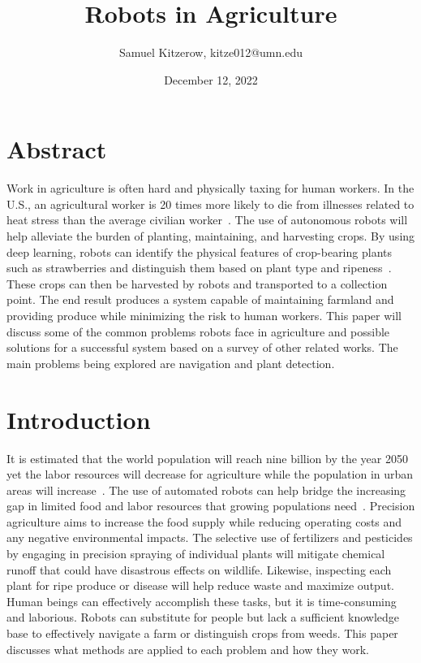 \documentclass[12pt]{article}
\title{Robots in Agriculture}
\author{Samuel Kitzerow, kitze012@umn.edu}
\date{December 12, 2022}
\begin{document}
\maketitle
\section*{Abstract}
Work in agriculture is often hard and physically taxing for human workers. In the U.S., an agricultural worker is 20 times more likely to die from illnesses related to heat stress than the average civilian worker~\cite{tigchelaar2020work}. The use of autonomous robots will help alleviate the burden of planting, maintaining, and harvesting crops. By using deep learning, robots can identify the physical features of crop-bearing plants such as strawberries and distinguish them based on plant type and ripeness~\cite{yu2019fruit}. These crops can then be harvested by robots and transported to a collection point. The end result produces a system capable of maintaining farmland and providing produce while minimizing the risk to human workers. This paper will discuss some of the common problems robots face in agriculture and possible solutions for a successful system based on a survey of other related works. The main problems being explored are navigation and plant detection.

\section{Introduction}
It is estimated that the world population will reach nine billion by the year 2050 yet the labor resources will decrease for agriculture while the population in urban areas will increase~\cite{9096177}. The use of automated robots can help bridge the increasing gap in limited food and labor resources that growing populations need~\cite{zhou2022intelligent}. Precision agriculture aims to increase the food supply while reducing operating costs and any negative environmental impacts. The selective use of fertilizers and pesticides by engaging in precision spraying of individual plants will mitigate chemical runoff that could have disastrous effects on wildlife. Likewise, inspecting each plant for ripe produce or disease will help reduce waste and maximize output. Human beings can effectively accomplish these tasks, but it is time-consuming and laborious. Robots can substitute for people but lack a sufficient knowledge base to effectively navigate a farm or distinguish crops from weeds. This paper discusses what methods are applied to each problem and how they work.
\end{document}
